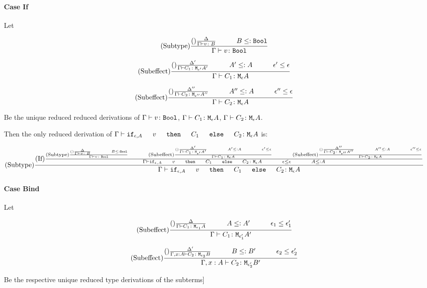 {    \paragraph{Case If}
    Let

    \begin{equation}
        \deltavrule{\G}{v}{B}{\B}
    \end{equation}

    \begin{equation}
        \deltacruleprime{\G}{C_1}{\e'}{A'}{\e}{A}
    \end{equation}

    \begin{equation}
        \deltacruleprimeprime{\G}{C_2}{\e''}{A''}{\e}{A}
    \end{equation}

    Be the unique reduced reduced derivations of $\Gamma \vdash v \colon \texttt{Bool}$, $\Gamma \vdash C_1 \colon \texttt{M}_{\epsilon}{A}$, $\Gamma \vdash C_2 \colon \texttt{M}_{\epsilon}{A}$.

    Then the only reduced derivation of $\gtyperelation{\ifthenelse{\e}{A}{v}{C_1}{C_2}}{\mea}$ is:

    \begin{equation}
        \treerule{Subtype}{
            \treerule{If}{
                \deltavrule{\G}{v}{B}{\B}
                \s\s
                \deltacruleprime{\G}{C_1}{\e'}{A'}{\e}{A}
                \s\s
                \deltacruleprimeprime{\G}{C_2}{\e''}{A''}{\e}{A}
            }{\gtyperelation{\ifthenelse{\e}{A}{v}{C_1}{C_2}}{\mea}\s\s \e\subeffect \e\s\s A \subtype A}
        }{\gtyperelation{\ifthenelse{\e}{A}{v}{C_1}{C_2}}{\mea}}
    \end{equation}

    \paragraph{Case Bind}

    Let 

    \begin{equation}
        \deltacrule{\G}{C_1}{\e_1}{A}{\e_1'}{A'}
    \end{equation}

    \begin{equation}
        \deltacruleprime{\G, x:A}{C_2}{\e_2}{B}{\e_2'}{B'}
    \end{equation}

    Be the respective unique reduced type derivations of the subterms]

}
